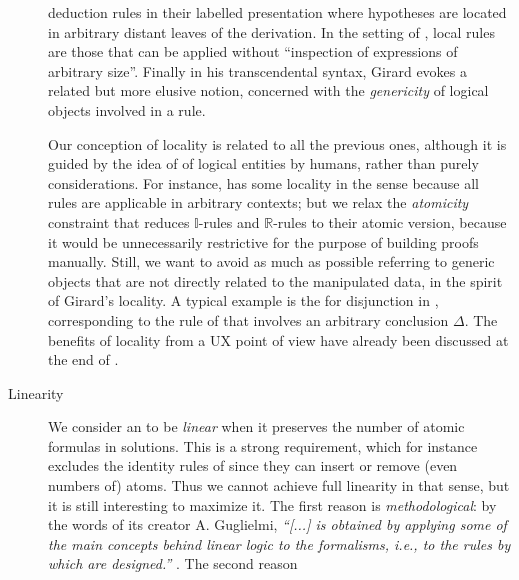 \begin{description}
{    deduction} rules in their labelled presentation where hypotheses are located
    in arbitrary distant leaves of the derivation. In the setting of , local rules are those that can be applied without ``inspection
    of expressions of arbitrary size''. Finally in his transcendental syntax, Girard evokes
    a related but more elusive notion, concerned with the \emph{genericity} of
    logical objects involved in a rule.
    
    Our conception of locality is related to all the previous ones, although it
    is guided by the idea of  of logical entities by humans,
    rather than purely  considerations. For instance,
     has some locality in the  sense because all rules
    are applicable in arbitrary contexts; but we relax the \emph{atomicity}
    constraint that reduces $\mathbb{I}$-rules and $\mathbb{R}$-rules to their
    atomic version, because it would be unnecessarily restrictive for the
    purpose of building proofs manually. Still, we want to avoid as much as
    possible referring to generic objects that are not directly related to the
    manipulated data, in the spirit of Girard's locality. A typical example is
    the   for disjunction in , corresponding to the {\rsf{{\lor}{-}}} rule of  that
    involves an arbitrary conclusion $\Delta$. The benefits of locality from a
    UX point of view have already been discussed at the end of
    .
  \item[Linearity] 
    We consider an  to be \emph{linear} when it preserves the
    number of atomic formulas in solutions. This is a strong requirement, which
    for instance excludes the identity rules of  since they can insert
    or remove (even numbers of) atoms. Thus we cannot achieve full linearity in
    that sense, but it is still interesting to maximize it. The first reason is
    \emph{methodological}: by the words of its creator A. Guglielmi,
    \textit{``[...]  is obtained by applying some of the main
    concepts behind linear logic to the formalisms, i.e., to the rules by which
     are designed.''} . The second reason

\end{description}
